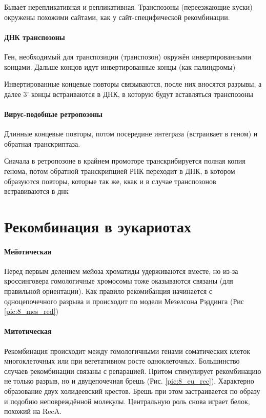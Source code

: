 Бывает нерепликативная и репликативная. Транспозоны (переезжающие куски) окружены похожими сайтами, как у сайт-специфической рекомбинации. 

\paragraph{ДНК транспозоны} Ген, необходимый для транспозиции (транспозон) окружён инвертированными концами. Дальше концов идут инвертированные концы (как палиндромы)

Инвертированные концевые повторы связываются, после них вносятся разрывы, а далее 3' концы встраиваются в ДНК, в которую будут вставляться транспозоны
 \begin{figure}[H]
\end{figure}
\paragraph{Вирус-подобные ретропозоны} Длинные концевые повторы, потом посередине интеграза (встраивает в геном) и обратная транскриптаза. 

Сначала в ретропозоне в крайнем промоторе транскрибируется полная копия генома, потом обратной транскрипцией РНК переходит в ДНК, в котором образуются повторы, которые так же, ккак и в случае транспозонов встравиваются в днк
\section{Рекомбинация в эукариотах}
\paragraph{Мейотическая}
Перед первым делением мейоза хроматиды удерживаются вместе, но из-за кроссинговера гомологичные хромосомы тоже оказываются связаны (для правильной ориентации). Как правило рекомибанция начинается с одноцепочечного разрыва и происходит по модели Мезелсона Рэддинга (Рис \ref{pic:8_mes_red})
 \begin{figure}[H]
\end{figure}
\paragraph{Митотическая}
Рекомбинация происходит между гомологичными генами соматических клеток многоклеточных или при вегетативном росте одноклеточных. Большинство случаев рекомбинации связаны с репарацией. Притом стимулирует рекомбинацию не только разрыв, но и двуцепочечная брешь (Рис. \ref{pic:8_eu_rec}). Характерно образование двух холидеевский крестов. Брешь при этом застраивается по образу и подобию неповреждённой молекулы. Центральную роль снова играет белок, похожий на RecA.
 \begin{figure}[H]
\end{figure}
